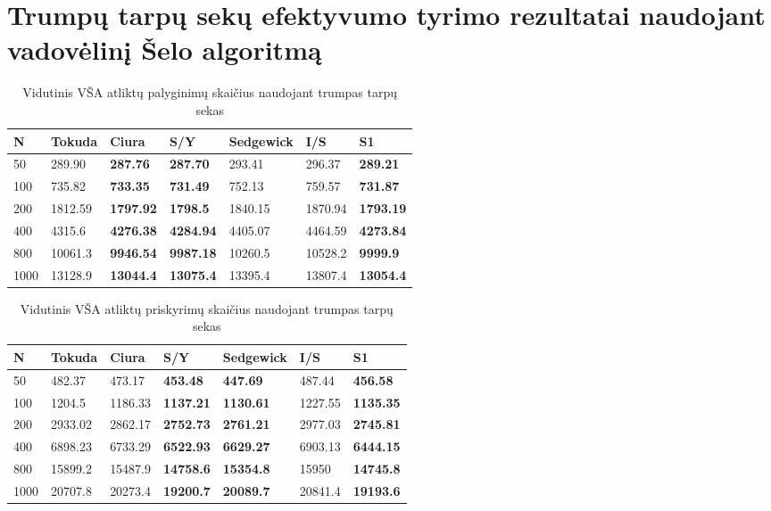 \documentclass{VUMIFInfKursinis}
\begin{document}
\section{Trumpų tarpų sekų efektyvumo tyrimo rezultatai naudojant vadovėlinį Šelo algoritmą}

\begin{table}[H]
  \caption{Vidutinis VŠA atliktų palyginimų skaičius naudojant trumpas tarpų sekas}
  \label{tss_small_comparisons}
  \begin{tabular}{|l|l|l|l|l|l|l|}
  \hline
  N    & Tokuda  & Ciura            & S/Y              & Sedgewick & I/S     & S1               \\ \hline
  50   & 289.90  & \textbf{287.76}  & \textbf{287.70}  & 293.41    & 296.37  & \textbf{289.21}  \\ \hline
  100  & 735.82  & \textbf{733.35}  & \textbf{731.49}  & 752.13    & 759.57  & \textbf{731.87}  \\ \hline
  200  & 1812.59 & \textbf{1797.92} & \textbf{1798.5}  & 1840.15   & 1870.94 & \textbf{1793.19} \\ \hline
  400  & 4315.6  & \textbf{4276.38} & \textbf{4284.94} & 4405.07   & 4464.59 & \textbf{4273.84} \\ \hline
  800  & 10061.3 & \textbf{9946.54} & \textbf{9987.18} & 10260.5   & 10528.2 & \textbf{9999.9}  \\ \hline
  1000 & 13128.9 & \textbf{13044.4} & \textbf{13075.4} & 13395.4   & 13807.4 & \textbf{13054.4} \\ \hline
  \end{tabular}
  \end{table}

\begin{table}[H]
  \caption{Vidutinis VŠA atliktų priskyrimų skaičius naudojant trumpas tarpų sekas}
  \label{tss_small_assignments}
  \begin{tabular}{|l|l|l|l|l|l|l|}
  \hline
  N    & Tokuda  & Ciura   & S/Y              & Sedgewick        & I/S     & S1               \\ \hline
  50   & 482.37  & 473.17  & \textbf{453.48}  & \textbf{447.69}  & 487.44  & \textbf{456.58}  \\ \hline
  100  & 1204.5  & 1186.33 & \textbf{1137.21} & \textbf{1130.61} & 1227.55 & \textbf{1135.35} \\ \hline
  200  & 2933.02 & 2862.17 & \textbf{2752.73} & \textbf{2761.21} & 2977.03 & \textbf{2745.81} \\ \hline
  400  & 6898.23 & 6733.29 & \textbf{6522.93} & \textbf{6629.27} & 6903.13 & \textbf{6444.15} \\ \hline
  800  & 15899.2 & 15487.9 & \textbf{14758.6} & \textbf{15354.8} & 15950   & \textbf{14745.8} \\ \hline
  1000 & 20707.8 & 20273.4 & \textbf{19200.7} & \textbf{20089.7} & 20841.4 & \textbf{19193.6} \\ \hline
  \end{tabular}
  \end{table}
\end{document}
